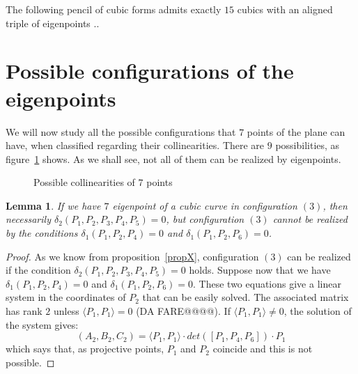 \documentclass{amsart}
\theoremstyle{plain}
\newtheorem{lemma}[theorem]{Lemma}
\theoremstyle{definition}
\newcommand{\scl}[2]{\langle #1, #2 \rangle}
\begin{document}
The following pencil of cubic forms admits exactly $15$ cubics with an aligned triple of eigenpoints ..








\section{Possible configurations of the eigenpoints}

We will now study all the possible configurations that $7$ points of the
plane can have, when classified regarding their collinearities. There are
$9$ possibilities, as figure~\ref{collin} shows. As we shall see,
not all of them can be realized by eigenpoints. 

\begin{figure}
\caption{Possible collinearities of $7$ points
\label{collin}}
\end{figure}


\begin{lemma} If we have $7$ eigenpoint of a cubic curve in configuration
  $(3)$, then necessarily $\delta_2(P_1, P_2, P_3, P_4, P_5)=0$, but
  configuration $(3)$ cannot be realized by the conditions
  $\delta_1(P_1, P_2, P_4) = 0$ and
  $\delta_1(P_1, P_2, P_6)=0$.
\end{lemma}
\begin{proof}
As we know from proposition~\ref{propX}, configuration $(3)$ can be realized
if the condition $\delta_2(P_1, P_2, P_3, P_4, P_5) = 0$ holds.
Suppose now that we have
$\delta_1(P_1, P_2, P_4) = 0$ and  $\delta_1(P_1, P_2, P_6)=0$. These
two equations give a linear system in the coordinates of $P_2$ that can
be easily solved. The associated matrix has rank $2$ unless
$\scl{P_1}{P_1}=0$ (DA FARE@@@@). If $\scl{P_1}{P_1} \not = 0$,
the solution of the system gives:
\[
(A_2, B_2, C_2) = \scl{P_1}{P_1} \cdot det([P_1, P_4, P_6])\cdot P_1
\]
which says that, as projective points, $P_1$ and $P_2$ coincide and this is
not possible. 
\end{proof}
\end{document}
